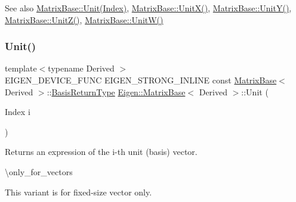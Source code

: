 \begin{DoxySeeAlso}{See also}
\mbox{\hyperlink{class_eigen_1_1_matrix_base_a9d7e97faf7755d3e85e831153f02846c}{Matrix\+Base\+::\+Unit(\+Index)}}, \mbox{\hyperlink{class_eigen_1_1_matrix_base_ac12aa899494685551e11f238836ee600}{Matrix\+Base\+::\+Unit\+X()}}, \mbox{\hyperlink{class_eigen_1_1_matrix_base_ab8e21066a2e5cf5ca8bb0383e44a6efa}{Matrix\+Base\+::\+Unit\+Y()}}, \mbox{\hyperlink{class_eigen_1_1_matrix_base_a122e525a8f5ef3e4d459055615f662de}{Matrix\+Base\+::\+Unit\+Z()}}, \mbox{\hyperlink{class_eigen_1_1_matrix_base_ac28c3d440440464b1fc8d9f2a6d5624a}{Matrix\+Base\+::\+Unit\+W()}} 
\end{DoxySeeAlso}
\mbox{\label{class_eigen_1_1_matrix_base_a9d7e97faf7755d3e85e831153f02846c}} 
\subsubsection{\texorpdfstring{Unit()}{Unit()}\hspace{0.1cm}{\footnotesize\ttfamily [2/2]}}
{\footnotesize\ttfamily template$<$typename Derived $>$ \\
E\+I\+G\+E\+N\+\_\+\+D\+E\+V\+I\+C\+E\+\_\+\+F\+U\+NC E\+I\+G\+E\+N\+\_\+\+S\+T\+R\+O\+N\+G\+\_\+\+I\+N\+L\+I\+NE const \mbox{\hyperlink{class_eigen_1_1_matrix_base}{Matrix\+Base}}$<$ Derived $>$\+::\mbox{\hyperlink{class_eigen_1_1_block}{Basis\+Return\+Type}} \mbox{\hyperlink{class_eigen_1_1_matrix_base}{Eigen\+::\+Matrix\+Base}}$<$ Derived $>$\+::Unit (\begin{DoxyParamCaption}\item[{Index}]{i }\end{DoxyParamCaption})\hspace{0.3cm}{\ttfamily [static]}}

\begin{DoxyReturn}{Returns}
an expression of the i-\/th unit (basis) vector.
\end{DoxyReturn}
\textbackslash{}only\+\_\+for\+\_\+vectors

This variant is for fixed-\/size vector only.

